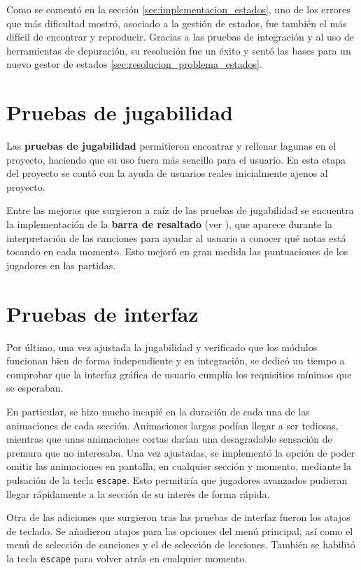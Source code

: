 Como se comentó en la sección \ref{sec:implementacion_estados}, uno de los
errores que más dificultad mostró, asociado a la gestión de estados, fue también
el más difícil de encontrar y reproducir. Gracias a las pruebas de integración y
al uso de herramientas de depuración, su resolución fue un éxito y sentó las
bases para un nuevo gestor de estados \ref{sec:resolucion_problema_estados}.

\section{Pruebas de jugabilidad}
Las \textbf{pruebas de jugabilidad} permitieron encontrar y rellenar lagunas en
el proyecto, haciendo que su uso fuera más sencillo para el usuario. En esta
etapa del proyecto se contó con la ayuda de usuarios reales inicialmente ajenos
al proyecto.

Entre las mejoras que surgieron a raíz de las pruebas de jugabilidad se
encuentra la implementación de la \textbf{barra de resaltado} (ver
\textit{}), que aparece durante la interpretación
de las canciones para ayudar al usuario a conocer qué notas está tocando en cada
momento. Esto mejoró en gran medida las puntuaciones de los jugadores en las
partidas.

\section{Pruebas de interfaz}
Por último, una vez ajustada la jugabilidad y verificado que los módulos
funcionan bien de forma independiente y en integración, se dedicó un tiempo a
comprobar que la interfaz gráfica de usuario cumplía los requisitios mínimos que
se esperaban.

En particular, se hizo mucho incapié en la duración de cada una de las
animaciones de cada sección. Animaciones largas podían llegar a ser tediosas,
mientras que unas animaciones cortas darían una desagradable sensación de
premura que no interesaba. Una vez ajustadas, se implementó la opción de poder
omitir las animaciones en pantalla, en cualquier sección y momento, mediante la
pulsación de la tecla \texttt{escape}. Esto permitiría que jugadores avanzados
pudieran llegar rápidamente a la sección de su interés de forma rápida.

Otra de las adiciones que surgieron tras las pruebas de interfaz fueron los
atajos de teclado. Se añadieron atajos para las opciones del menú principal, así
como el menú de selección de canciones y el de selección de lecciones. También
se habilitó la tecla \texttt{escape} para volver atrás en cualquier momento.

